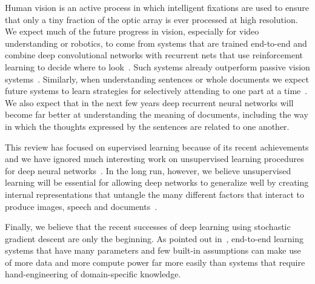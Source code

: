 \documentclass[]{article}
\begin{document}
Human vision is an active process in which intelligent fixations are used
to ensure that only a tiny fraction of the optic array is ever processed at
high resolution. We expect much of the future progress in vision,
especially for video understanding or robotics, to come from systems that
are trained end-to-end and combine deep convolutional networks with
recurrent nets that use reinforcement learning to decide where to
look~\citep{rl+attention}.  Such systems already outperform passive vision
systems~\citep{ba+mnih}.  Similarly, when understanding sentences or whole
documents we expect future systems to learn strategies for selectively
attending to one part at a time~\citep{Bahdanau-et-al-arxiv2014}. We also expect
that in the next few years deep recurrent neural networks will become far
better at understanding the meaning of documents, including the way in
which the thoughts expressed by the sentences are related to one another.

This review has focused on supervised learning because of its recent
achievements and we have ignored much interesting work on unsupervised
learning procedures for deep neural 
networks~\citep{Salakhutdinov2009-small,wake-sleep,
  google-cat, denoising-auto, ranzato-pami, more recent}. In the long run,
however, we believe unsupervised learning will be essential for allowing
deep networks to generalize well by creating internal representations that
untangle the many different factors that interact to produce images, speech
and documents~\citep{Yann,Bengio-Courville-Vincent-TPAMI2013}.

Finally, we believe that the recent successes of deep learning using
stochastic gradient descent are only the beginning.  As pointed out
in~\citet{Bengio+Lecun-chapter2007-small}, end-to-end learning
systems that have many parameters and few built-in assumptions can make use
of more data and more compute power far more easily than systems that
require hand-engineering of domain-specific knowledge.

 





\end{document}
